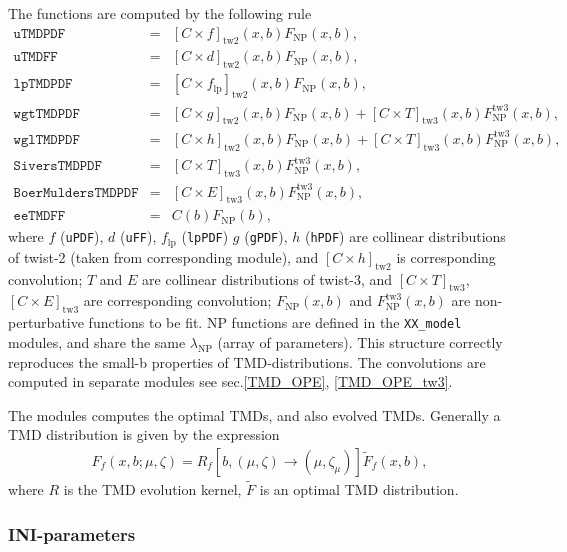 \documentclass[prd,nofootinbib,eqsecnum,final]{revtex4}
\renewcommand{\(}{\left(}
\renewcommand{\)}{\right)}
\renewcommand{\[}{\left[}
\renewcommand{\]}{\right]}
\begin{document}
The functions are computed by the following rule
\begin{eqnarray}
\texttt{uTMDPDF}&=&[C\times f]_{\text{tw2}}(x,b)F_{\text{NP}}(x,b),
\\
\texttt{uTMDFF}&=&[C\times d]_{\text{tw2}}(x,b)F_{\text{NP}}(x,b),
\\
\texttt{lpTMDPDF}&=&[C\times f_{\text{lp}}]_{\text{tw2}}(x,b)F_{\text{NP}}(x,b),
\\
\texttt{wgtTMDPDF}&=&[C\times g]_{\text{tw2}}(x,b)F_{\text{NP}}(x,b)+[C\times T]_{\text{tw3}}(x,b)F^{\text{tw3}}_{\text{NP}}(x,b),
\\
\texttt{wglTMDPDF}&=&[C\times h]_{\text{tw2}}(x,b)F_{\text{NP}}(x,b)+[C\times T]_{\text{tw3}}(x,b)F^{\text{tw3}}_{\text{NP}}(x,b),
\\
\texttt{SiversTMDPDF}&=&[C\times T]_{\text{tw3}}(x,b)F^{\text{tw3}}_{\text{NP}}(x,b),
\\
\texttt{BoerMuldersTMDPDF}&=&[C\times E]_{\text{tw3}}(x,b)F^{\text{tw3}}_{\text{NP}}(x,b),
\\
\texttt{eeTMDFF}&=&C(b)F_{\text{NP}}(b),
\end{eqnarray}
where $f$ (\texttt{uPDF}), $d$ (\texttt{uFF}), $f_{\text{lp}}$ (\texttt{lpPDF}) $g$ (\texttt{gPDF}), $h$ (\texttt{hPDF}) are collinear distributions of twist-2 (taken from corresponding module), and $[C\times h]_{\text{tw2}}$ is corresponding convolution;
$T$ and $E$ are collinear distributions of twist-3, and $[C\times T]_{\text{tw3}}$, $[C\times E]_{\text{tw3}}$ are corresponding convolution; $F_{\text{NP}}(x,b)$ and $F^{\text{tw3}}_{\text{NP}}(x,b)$ are non-perturbative functions to be fit. NP functions are defined in the \texttt{XX\_model} modules, and share the same $\lambda_{\text{NP}}$ (array of parameters). This structure correctly reproduces the small-b properties of TMD-distributions. The convolutions are computed in separate modules see sec.\ref{TMD_OPE}, \ref{TMD_OPE_tw3}.

The modules computes the optimal TMDs, and also evolved TMDs. Generally a TMD distribution is given by the expression
\begin{eqnarray}\label{TMD:F=RF}
F_f(x,b;\mu,\zeta)=R_f[b,(\mu,\zeta)\to(\mu,\zeta_{\mu})]\tilde F_f(x,b),
\end{eqnarray}
where $R$ is the TMD evolution kernel, $\tilde F$ is an optimal TMD distribution. 

\subsubsection{INI-parameters}
\end{document}
